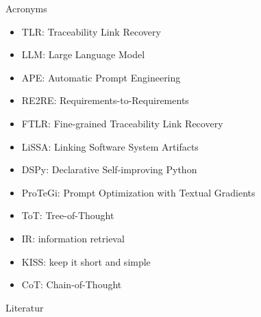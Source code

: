 \documentclass{sdqbeamer}
\begin{document}
\appendix
\beginbackup

\begin{frame}{Acronyms}
    \begin{itemize}
        \item TLR: Traceability Link Recovery
        \item LLM: Large Language Model
        \item APE: Automatic Prompt Engineering
        \item RE2RE: Requirements-to-Requirements
        \item FTLR: Fine-grained Traceability Link Recovery
        \item LiSSA: Linking Software System Artifacts
        \item DSPy: Declarative Self-improving Python
        \item ProTeGi: Prompt Optimization with Textual Gradients
        \item ToT: Tree-of-Thought
        \item IR: information retrieval
        \item KISS: keep it short and simple
        \item CoT: Chain-of-Thought
    \end{itemize}
\end{frame}

\begin{frame}[allowframebreaks]{Literatur}

\printbibliography
\end{frame}

\backupend
\end{document}
